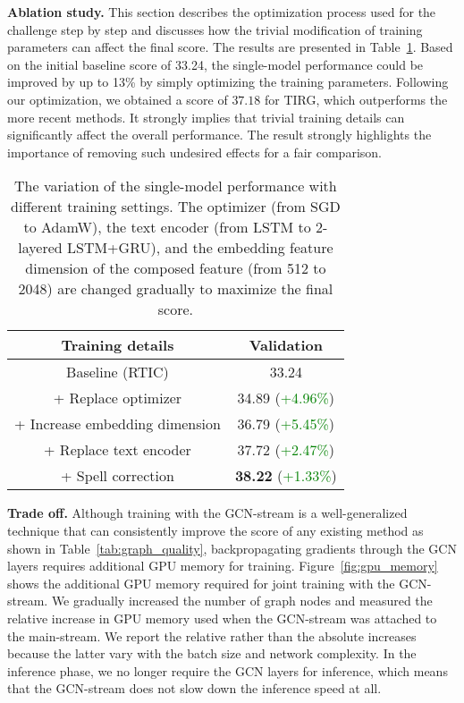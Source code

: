 \documentclass[10pt,twocolumn,letterpaper]{article}
\begin{document}
\noindent
\textbf{Ablation study.}
This section describes the optimization process used for the challenge step by step and discusses how the trivial modification of training parameters can affect the final score.
The results are presented in Table~\ref{tab:ablation_study}. Based on the initial baseline score of 33.24, the single-model performance could be improved by up to 13\% by simply optimizing the training parameters. Following our optimization, we obtained a score of $37.18$ for TIRG, which outperforms the more recent methods. It strongly implies that trivial training details can significantly affect the overall performance. The result strongly highlights the importance of removing such undesired effects for a fair comparison.

    \begin{table}[h]
        \caption{The variation of the single-model performance with different training settings. The optimizer (from SGD to AdamW), the text encoder (from LSTM to 2-layered LSTM+GRU), and the embedding feature dimension of the composed feature (from 512 to 2048) are changed gradually to maximize the final score.}
        \centering
        \begin{adjustbox}{width=0.41\textwidth}
        \begin{tabular}{cc}
        \toprule
        Training details & Validation \\
        \hline \hline
        Baseline (RTIC) & 33.24 \\
        \hline
        + Replace optimizer & 34.89 (\textcolor{green}{+4.96\%}) \\
        + Increase embedding dimension & 36.79 (\textcolor{green}{+5.45\%}) \\
        + Replace text encoder & 37.72 (\textcolor{green}{+2.47\%}) \\
        + Spell correction & \textbf{38.22} (\textcolor{green}{+1.33\%}) \\
        \bottomrule
        \end{tabular}
        \end{adjustbox}
        \label{tab:ablation_study}
    \end{table}
    
\noindent
\textbf{Trade off.} Although training with the GCN-stream is a well-generalized technique that can consistently improve the score of any existing method as shown in Table~\ref{tab:graph_quality}, backpropagating gradients through the GCN layers requires additional GPU memory for training. Figure~\ref{fig:gpu_memory} shows the additional GPU memory required for joint training with the GCN-stream. We gradually increased the number of graph nodes and measured the relative increase in GPU memory used when the GCN-stream was attached to the main-stream. We report the relative rather than the absolute increases because the latter vary with the batch size and network complexity. In the inference phase, we no longer require the GCN layers for inference, which means that the GCN-stream does not slow down the inference speed at all.
\end{document}
